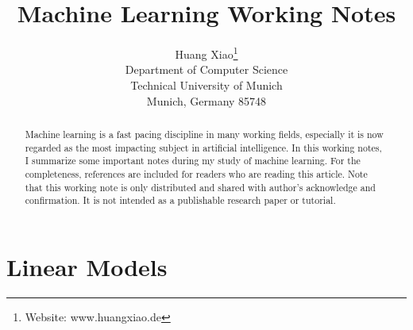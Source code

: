 \documentclass{article}
\title{Machine Learning Working Notes}
\author{
	Huang Xiao\thanks{Website: www.huangxiao.de} \\
	Department of Computer Science\\
	Technical University of Munich\\
	Munich, Germany 85748 \\
}
\begin{document}
\maketitle


\begin{abstract}
	Machine learning is a fast pacing discipline in many working fields, especially it is now regarded as the most impacting subject in artificial intelligence. In this working notes, I summarize some important notes during my study of machine learning. For the completeness, references are included for readers who are reading this article. Note that this working note is only distributed and shared with author's acknowledge and confirmation. It is not intended as a publishable research paper or tutorial.

\end{abstract}
\section{Linear Models}
\end{document}
